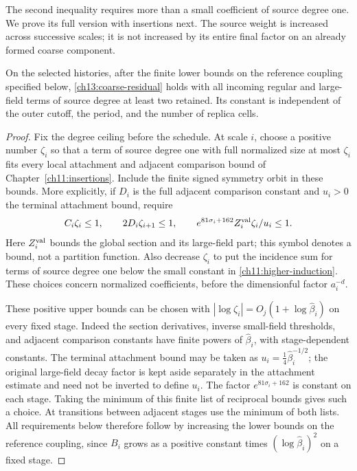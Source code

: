 The second inequality requires more than a small coefficient of source degree one.
We prove its full version with insertions next. The source weight is increased
across successive scales; it is not increased by its entire final factor
on an already formed coarse component.

\begin{lemma}
\label{ch13:coarse-residual-supplier}
On the selected histories, after the finite lower bounds on the reference coupling
specified below, \eqref{ch13:coarse-residual} holds with all incoming
regular and large-field terms of source degree at least two retained. Its constant is independent
of the outer cutoff, the period, and the number of replica cells.
\end{lemma}
\begin{proof}
Fix the degree ceiling before the schedule. At scale $i$, choose a
positive number $\zeta_i$ so that a term of source degree one with full normalized
size at most $\zeta_i$ fits every local attachment and adjacent
comparison bound of Chapter~\ref{ch11:insertions}. Include the finite
signed symmetry orbit in these bounds. More explicitly, if $D_i$ is
the full adjacent comparison constant and $u_i>0$ the terminal
attachment bound, require
\[
 C_i\zeta_i\le1,\qquad 2D_i\zeta_{i+1}\le1,\qquad
 e^{81\sigma_i+162}Z_i^{\rm val}\zeta_i/u_i\le1.
\]
Here $Z_i^{\rm val}$ bounds the global section and its large-field
part; this symbol denotes a bound, not a partition function.
Also decrease $\zeta_i$ to put the incidence sum for terms of source degree one below the
small constant in \eqref{ch11:higher-induction}. These choices concern
normalized coefficients, before the dimensionful factor $a_i^{-d}$.

These positive upper bounds can be chosen with
$|\log\zeta_i|=O_j(1+\log\widehat\beta_i)$ on every fixed stage.
Indeed the section derivatives, inverse small-field thresholds, and
adjacent comparison constants have finite powers of
$\widehat\beta_i$, with stage-dependent constants. The terminal attachment bound may be taken as $u_i=\tfrac14\widehat\beta_i^{-1/2}$; the original large-field decay factor
is kept aside separately in the attachment estimate and need not be
inverted to define $u_i$. The factor $e^{81\sigma_i+162}$ is constant
on each stage. Taking the minimum of this finite list of reciprocal
bounds gives such a choice. At transitions between adjacent stages use the minimum
of both lists. All requirements below therefore follow by increasing
the lower bounds on the reference coupling, since $B_i$ grows as a positive constant times
$(\log\widehat\beta_i)^2$ on a fixed stage.


\end{proof}

